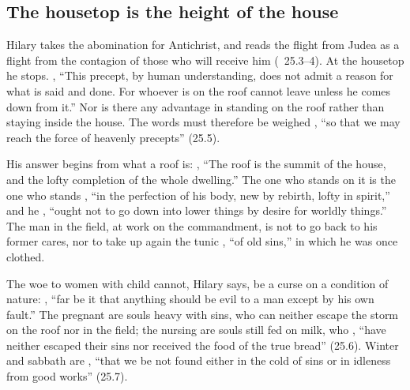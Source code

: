 \subsection{The housetop is the height of the house}
\label{sec:flight-hilary}

Hilary takes the abomination for Antichrist, and reads the flight from Judea
as a flight from the contagion of those who will receive him (~25.3--4). At the housetop he stops. , ``This precept, by human
understanding, does not admit a reason for what is said and done. For whoever
is on the roof cannot leave unless he comes down from it.'' Nor is there any
advantage in standing on the roof rather than staying inside the house. The
words must therefore be weighed , ``so that we may reach the force of heavenly precepts''
(25.5).

His answer begins from what a roof is: , ``The roof is the summit of the house,
and the lofty completion of the whole dwelling.'' The one who stands on it is
the one who stands , ``in the perfection of his body, new by rebirth, lofty in
spirit,'' and he , ``ought not to go down into lower things by desire for
worldly things.'' The man in the field, at work on the commandment, is not to
go back to his former cares, nor to take up again the tunic , ``of old sins,'' in which he was once clothed.

The woe to women with child cannot, Hilary says, be a curse on a condition of
nature: , ``far be it that anything should be evil to a man except by his own
fault.'' The pregnant are souls heavy with sins, who can neither escape the
storm on the roof nor in the field; the nursing are souls still fed on milk,
who , ``have
neither escaped their sins nor received the food of the true bread'' (25.6).
Winter and sabbath are , ``that we be not found either in the cold of sins
or in idleness from good works'' (25.7).

